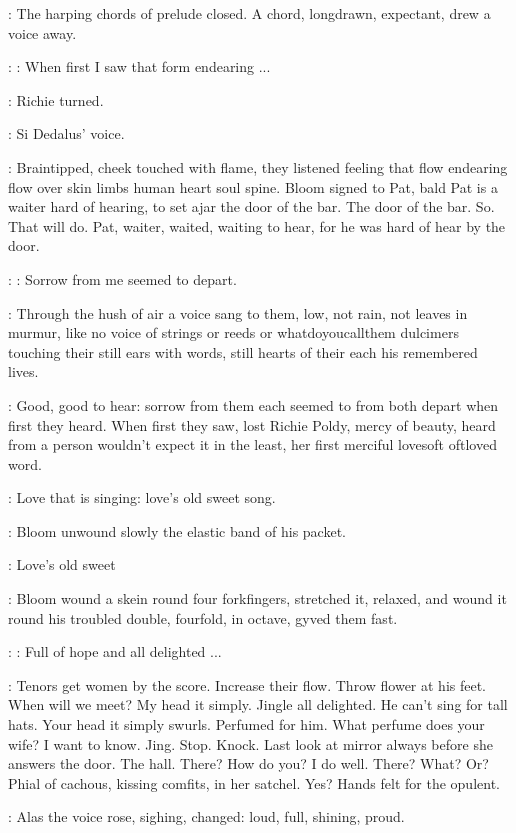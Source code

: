 :
The harping chords of prelude closed. A chord, longdrawn, expectant,
drew a voice away.

\Simon:
\Song:
When first I saw that form endearing ...

:
Richie turned.

\Goulding:
Si Dedalus' voice.

:
Braintipped, cheek touched with flame, they listened feeling that flow
endearing flow over skin limbs human heart soul spine. Bloom signed to
Pat, bald Pat is a waiter hard of hearing,
to set ajar the door of the
bar. The door of the bar. So. That will do. Pat, waiter, waited, waiting
to hear, for he was hard of hear by the door.

\Simon:
\Song:
Sorrow from me seemed to depart.

:
Through the hush of air a voice sang to them, low, not rain, not leaves
in murmur, like no voice of strings or reeds or whatdoyoucallthem
dulcimers touching their still ears with words, still hearts of their each
his remembered lives.

\BloomInt:
Good, good to hear: sorrow from them each seemed to
from both depart when first they heard. When first they saw, lost Richie
Poldy, mercy of beauty, heard from a person wouldn't expect it in the least,
her first merciful
lovesoft oftloved word.

\BloomInt:
Love that is singing: love's old sweet song.

:
Bloom unwound slowly
the elastic band of his packet.

\BloomInt:
Love's old sweet

:
Bloom
wound a skein round four forkfingers, stretched it, relaxed, and wound it
round his troubled double, fourfold, in octave, gyved them fast.

\Simon:
\Song:
Full of hope and all delighted ...

\BloomInt:
Tenors get women by the score. Increase their flow. Throw flower at
his feet. When will we meet? My head it simply. Jingle all delighted. He
can't sing for tall hats. Your head it simply swurls. Perfumed for him.
What perfume does your wife? I want to know. Jing. Stop. Knock. Last look
at mirror always before she answers the door. The hall.
There? How do you?
I do well. There? What? Or? Phial of cachous, kissing comfits, in her
satchel. Yes? Hands felt for the opulent.

:
Alas the voice rose, sighing, changed: loud, full, shining, proud.

